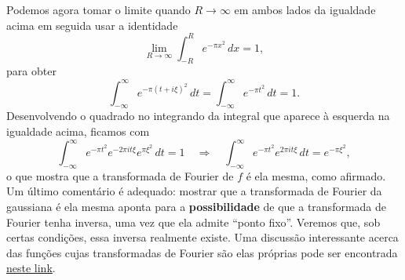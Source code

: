         Podemos agora tomar o limite quando $R\to\infty$ em ambos
        lados da igualdade acima em seguida usar a identidade
        \begin{equation*}
            \lim_{R\to\infty} \int_{-R}^R e^{-\pi x^2} \, dx = 1,
        \end{equation*}
        para obter
        \begin{equation*}
            \int_{-\infty}^{\infty} e^{-\pi(t+i\xi)^2}\, dt
            =
            \int_{-\infty}^{\infty} e^{-\pi t^2}\, dt = 1.
        \end{equation*}
        Desenvolvendo o quadrado no integrando da integral que aparece
        à esquerda na igualdade acima, ficamos com
        \begin{equation*}
            \int_{-\infty}^{\infty} e^{-\pi t^2} e^{-2\pi i t\xi }  e^{\pi\xi^2}\, dt = 1
            \quad \Longrightarrow\quad 
            \int_{-\infty}^{\infty} e^{-\pi t^2} e^{2\pi i t\xi } \, dt = e^{-\pi\xi^2},
        \end{equation*}
        o que mostra que a transformada de Fourier de $f$ é ela mesma, como afirmado.
        Um último comentário é adequado: mostrar que a transformada de Fourier da
        gaussiana é ela mesma aponta para a {\bf possibilidade} de que a transformada
        de Fourier tenha inversa, uma vez que ela admite ``ponto fixo''. Veremos que,
        sob certas condições, essa inversa realmente existe. Uma discussão interessante
        acerca das funções cujas transformadas de Fourier são elas próprias pode ser
        encontrada \href{https://math.stackexchange.com/questions/728670/functions-that-are-their-own-fourier-transform}{neste link}.
